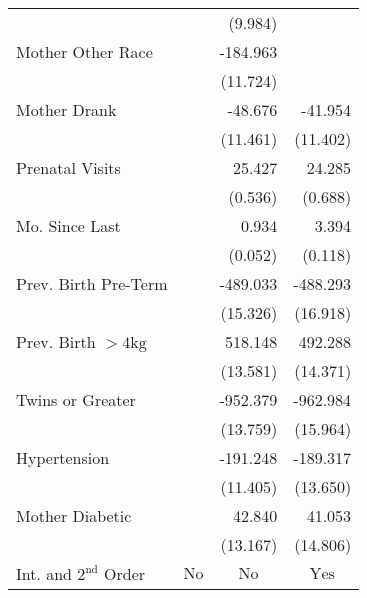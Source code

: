 \begin{table}[h!]
\begin{tabular}{l*{3}{D{.}{.}{-1}}}
                    &                     &     (9.984)         &                     \\
Mother Other Race   &                     &    -184.963\sym{***}&                     \\
                    &                     &    (11.724)         &                     \\
Mother Drank        &                     &     -48.676\sym{***}&     -41.954\sym{***}\\
                    &                     &    (11.461)         &    (11.402)         \\
Prenatal Visits     &                     &      25.427\sym{***}&      24.285\sym{***}\\
                    &                     &     (0.536)         &     (0.688)         \\
Mo. Since Last      &                     &       0.934\sym{***}&       3.394\sym{***}\\
                    &                     &     (0.052)         &     (0.118)         \\
Prev. Birth Pre-Term&                     &    -489.033\sym{***}&    -488.293\sym{***}\\
                    &                     &    (15.326)         &    (16.918)         \\
Prev. Birth $>4\text{kg}$&                     &     518.148\sym{***}&     492.288\sym{***}\\
                    &                     &    (13.581)         &    (14.371)         \\
Twins or Greater    &                     &    -952.379\sym{***}&    -962.984\sym{***}\\
                    &                     &    (13.759)         &    (15.964)         \\
Hypertension        &                     &    -191.248\sym{***}&    -189.317\sym{***}\\
                    &                     &    (11.405)         &    (13.650)         \\
Mother Diabetic     &                     &      42.840\sym{**} &      41.053\sym{**} \\
                    &                     &    (13.167)         &    (14.806)         \\
Int. and $2^{\text{nd}}$ Order&         &         &         \\

\end{tabular}
\end{table}
